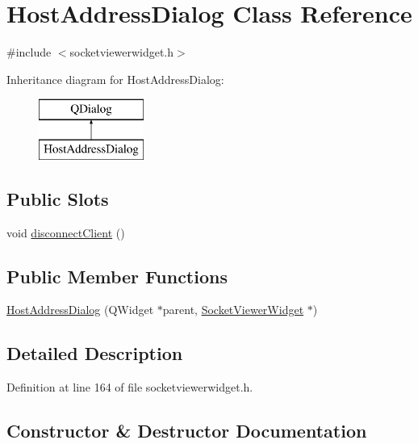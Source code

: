\hypertarget{class_host_address_dialog}{}\section{Host\+Address\+Dialog Class Reference}
\label{class_host_address_dialog}


{\ttfamily \#include $<$socketviewerwidget.\+h$>$}

Inheritance diagram for Host\+Address\+Dialog\+:\begin{figure}[H]
\begin{center}
\leavevmode
\includegraphics[height=2.000000cm]{class_host_address_dialog}
\end{center}
\end{figure}
\subsection*{Public Slots}
\begin{DoxyCompactItemize}
\item 
void \mbox{\hyperlink{class_host_address_dialog_a1a2b97b755df7b673a593aca4fb42791}{disconnect\+Client}} ()
\end{DoxyCompactItemize}
\subsection*{Public Member Functions}
\begin{DoxyCompactItemize}
\item 
\mbox{\hyperlink{class_host_address_dialog_a99ae35001dbef2d720d34770e897a74c}{Host\+Address\+Dialog}} (Q\+Widget $\ast$parent, \mbox{\hyperlink{class_socket_viewer_widget}{Socket\+Viewer\+Widget}} $\ast$)
\end{DoxyCompactItemize}


\subsection{Detailed Description}


Definition at line 164 of file socketviewerwidget.\+h.



\subsection{Constructor \& Destructor Documentation}
\mbox{\label{class_host_address_dialog_a99ae35001dbef2d720d34770e897a74c}} 
